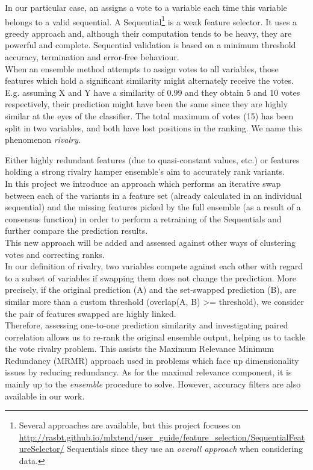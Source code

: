 In our particular case, an  assigns a vote to a variable each time this variable belongs to a valid sequential. A Sequential\footnote{Several approaches are available, but this project focuses on \href{forward/backward}{http://rasbt.github.io/mlxtend/user_guide/feature_selection/SequentialFeatureSelector/} Sequentials since they use an \emph{overall approach} when considering data.} is a weak feature selector. It uses a greedy approach and, although their computation tends to be heavy, they are powerful and complete. Sequential validation is based on a minimum threshold accuracy, termination and error-free behaviour.
\\

When an ensemble method attempts to assign votes to all variables, those features which hold a significant similarity might alternately receive the votes. E.g. assuming X and Y have a similarity of 0.99 and they obtain 5 and 10 votes respectively, their prediction might have been the same since they are highly similar at the eyes of the classifier. The total maximum of votes (15) has been split in two variables, and both have lost positions in the ranking. We name this phenomenon \emph{rivalry}.

Either highly redundant features (due to quasi-constant values, etc.) or features holding a strong rivalry hamper ensemble's aim to accurately rank variants.
\\

In this project we introduce an approach which performs an iterative swap between each of the variants in a feature set (already calculated in an individual sequential) and the missing features picked by the full ensemble (as a result of a consensus function) in order to perform a retraining of the Sequentials and further compare the prediction results.
\\

This new approach will be added and assessed against other ways of clustering votes and correcting ranks.
\\

In our definition of rivalry, two variables compete against each other with regard to a subset of variables if swapping them does not change the prediction.
More precisely, if the original prediction (A) and the set-swapped prediction (B), are similar more than a custom threshold (overlap(A, B) >= threshold), we consider the pair of features swapped are highly linked.
\\

Therefore, assessing one-to-one prediction similarity and investigating paired correlation allows us to re-rank the original ensemble output, helping us to tackle the vote rivalry problem. This assists the Maximum Relevance Minimum Redundancy (MRMR) \cite{Auffarth2010ComparisonImages}\cite{Peng2005FeatureMin-Redundancy} approach used in problems which face up dimensionality issues by reducing redundancy. As for the maximal relevance component, it is mainly up to the \emph{ensemble} procedure to solve. However, accuracy filters are also available in our work.
